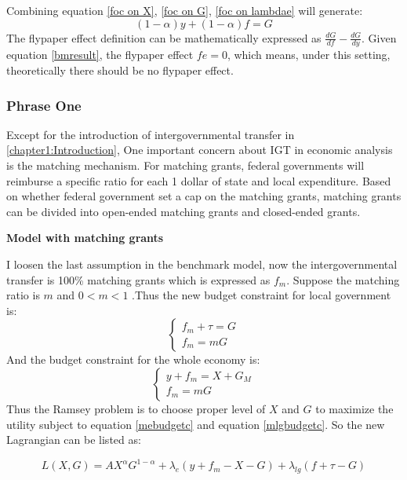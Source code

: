 Combining equation \ref{foc on X}, \ref{foc on G}, \ref{foc on lambdae} will generate:
\begin{equation}
    (1-\alpha)y+(1-\alpha)f=G \label{bmresult}
\end{equation}
The flypaper effect definition can be mathematically expressed as $\frac{d G}{d f}-\frac{d G}{d y}$. Given equation \ref{bmresult}, the flypaper effect $fe=0$, which means, under this setting, theoretically there should be no flypaper effect.
\subsubsection{Phrase One}
Except for the introduction of intergovernmental transfer in \ref*{chapter1:Introduction}, One important concern about IGT in economic analysis is the matching mechanism. For matching grants, federal governments will reimburse a specific ratio for each 1 dollar of state and local expenditure. Based on whether federal government set a cap on the matching grants, matching grants can be divided into open-ended matching grants and closed-ended grants.

\textbf{Model with matching grants}

I loosen the last assumption in the benchmark model, now the intergovernmental transfer is 100\% matching grants which is expressed as $f_m$. Suppose the matching ratio is $m$ and $0<m<1$  \label{mr}.Thus the new budget constraint for local government is:
\begin{equation}
    \left\{\begin{array}{l} \label{mlgbudgetc}
        f_m+\tau=G \\
        f_m=m G
    \end{array}\right.
\end{equation}
And the budget constraint for the whole economy is:
\begin{equation}
    \left\{\begin{array}{l} \label{mebudgetc}
        y+f_m=X+G_M \\
        f_m=m G
    \end{array}\right.
\end{equation}
Thus the Ramsey problem is to choose proper level of $X$ and $G$ to maximize the utility subject to equation \ref{mebudgetc} and equation \ref{mlgbudgetc}.
So the new Lagrangian can be listed as:

\begin{equation} \label{mlagrangian}
    L(X,G)=AX^{\alpha}G^{1-\alpha}+\lambda_{e}(y+f_m-X-G)+\lambda_{lg}(f+\tau-G)
\end{equation}

